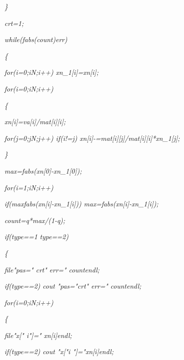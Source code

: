 \documentclass[a4paper,twoside]{book}
\begin{document}
\textit{\qquad \}}

\textit{\qquad crt=1;}

\textit{\qquad while(fabs(count)\TEXTsymbol{>}err)}

\textit{\qquad \{}

\textit{\qquad \qquad for(i=0;i\TEXTsymbol{<}N;i++) xn\_1[i]=xn[i];}

\textit{\qquad \qquad for(i=0;i\TEXTsymbol{<}N;i++)}

\textit{\qquad \qquad \{}

\textit{\qquad \qquad \qquad xn[i]=va[i]/mat[i][i];}

\textit{\qquad \qquad \qquad for(j=0;j\TEXTsymbol{<}N;j++) if(i!=j)
xn[i]-=mat[i][j]/mat[i][i]*xn\_1[j];}

\textit{\qquad \qquad \}}

\textit{\qquad \qquad max=fabs(xn[0]-xn\_1[0]);}

\textit{\qquad \qquad for(i=1;i\TEXTsymbol{<}N;i++) }

\qquad \qquad \qquad \textit{if(max\TEXTsymbol{<}fabs(xn[i]-xn\_1[i]))
max=fabs(xn[i]-xn\_1[i]);}

\textit{\qquad \qquad count=q*max/(1-q);}

\textit{\qquad \qquad if(type==1 \TEXTsymbol{\vert}\TEXTsymbol{\vert}
type==2)}

\textit{\qquad \qquad \{}

\textit{\qquad \qquad \qquad file\TEXTsymbol{<}\TEXTsymbol{<}"pas="%
\TEXTsymbol{<}\TEXTsymbol{<}crt\TEXTsymbol{<}\TEXTsymbol{<}" err="%
\TEXTsymbol{<}\TEXTsymbol{<}count\TEXTsymbol{<}\TEXTsymbol{<}endl;}

\textit{\qquad \qquad \qquad if(type==2) cout\TEXTsymbol{<}\TEXTsymbol{<}%
"pas="\TEXTsymbol{<}\TEXTsymbol{<}crt\TEXTsymbol{<}\TEXTsymbol{<}" err="%
\TEXTsymbol{<}\TEXTsymbol{<}count\TEXTsymbol{<}\TEXTsymbol{<}endl;}

\textit{\qquad \qquad \qquad for(i=0;i\TEXTsymbol{<}N;i++)}

\textit{\qquad \qquad \qquad \{}

\textit{\qquad \qquad \qquad \qquad file\TEXTsymbol{<}\TEXTsymbol{<}"x["%
\TEXTsymbol{<}\TEXTsymbol{<}i\TEXTsymbol{<}\TEXTsymbol{<}"]="\TEXTsymbol{<}%
\TEXTsymbol{<}xn[i]\TEXTsymbol{<}\TEXTsymbol{<}endl;}

\textit{\qquad \qquad \qquad \qquad if(type==2) cout\TEXTsymbol{<}%
\TEXTsymbol{<}"x["\TEXTsymbol{<}\TEXTsymbol{<}i\TEXTsymbol{<}\TEXTsymbol{<}%
"]="\TEXTsymbol{<}\TEXTsymbol{<}xn[i]\TEXTsymbol{<}\TEXTsymbol{<}endl;}
\end{document}
